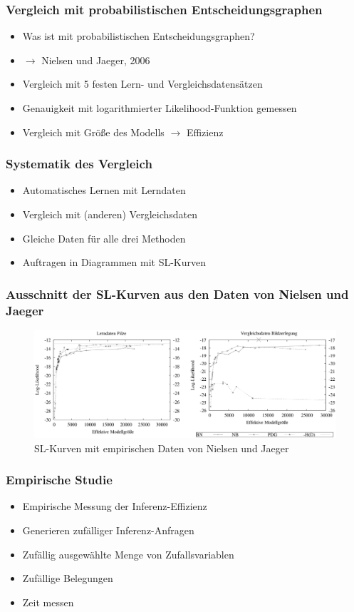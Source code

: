 \documentclass{beamer}
\begin{document}
\begin{frame}
  \frametitle{Vergleich mit probabilistischen Entscheidungsgraphen}
  \begin{itemize}
    \item Was ist mit probabilistischen Entscheidungsgraphen?
    \item $\rightarrow$ Nielsen und Jaeger, 2006
    \item Vergleich mit 5 festen Lern- und Vergleichsdatensätzen
    \item Genauigkeit mit logarithmierter Likelihood-Funktion gemessen
    \item Vergleich mit Größe des Modells $\rightarrow$ Effizienz
  \end{itemize}
\end{frame}

\begin{frame}
  \frametitle{Systematik des Vergleich}
  \begin{itemize}
    \item Automatisches Lernen mit Lerndaten
    \item Vergleich mit (anderen) Vergleichsdaten
    \item Gleiche Daten für alle drei Methoden
    \item Auftragen in Diagrammen mit SL-Kurven
  \end{itemize}
\end{frame}

\begin{frame}
  \frametitle{Ausschnitt der SL-Kurven aus den Daten von Nielsen und Jaeger}
  \begin{figure}[H]
    \caption{\label{fig:datagraphs}SL-Kurven mit empirischen Daten von Nielsen und Jaeger}
    \centering
    \includegraphics{graphs.png}
  \end{figure}
\end{frame}

\begin{frame}
  \frametitle{Empirische Studie}
  \begin{itemize}
    \item Empirische Messung der Inferenz-Effizienz
    \item Generieren zufälliger Inferenz-Anfragen
    \item Zufällig ausgewählte Menge von Zufallsvariablen
    \item Zufällige Belegungen
    \item Zeit messen
  \end{itemize}
\end{frame}
\end{document}
